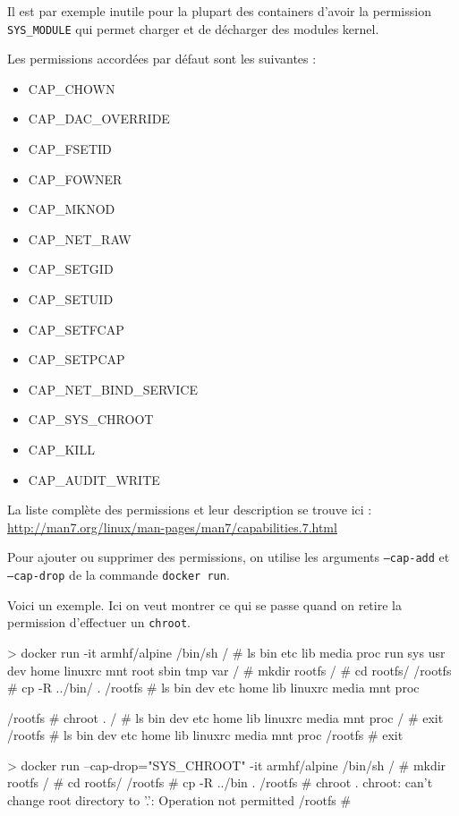 \documentclass[11pt,a4paper,oneside]{report}
\newcommand{\code}[1]{\texttt{#1}}
\begin{document}
Il est par exemple inutile pour la plupart des containers d'avoir la permission \code{SYS\_MODULE} qui permet charger et de décharger des modules kernel.

Les permissions accordées par défaut sont les suivantes\cite{github_docker_kernel_capabilities} :
\begin{itemize}
\item CAP\_CHOWN
\item CAP\_DAC\_OVERRIDE
\item CAP\_FSETID
\item CAP\_FOWNER
\item CAP\_MKNOD
\item CAP\_NET\_RAW
\item CAP\_SETGID
\item CAP\_SETUID
\item CAP\_SETFCAP
\item CAP\_SETPCAP
\item CAP\_NET\_BIND\_SERVICE
\item CAP\_SYS\_CHROOT
\item CAP\_KILL
\item CAP\_AUDIT\_WRITE
\end{itemize}

La liste complète des permissions et leur description se trouve ici : \url{http://man7.org/linux/man-pages/man7/capabilities.7.html}

Pour ajouter ou supprimer des permissions, on utilise les arguments \code{--cap-add} et \code{--cap-drop} de la commande \code{docker run}.

Voici un exemple. Ici on veut montrer ce qui se passe quand on retire la permission d'effectuer un \code{chroot}.
\begin{textcode}
> docker run -it armhf/alpine /bin/sh
/ # ls
bin   etc   lib       media   proc   run    sys   usr
dev   home  linuxrc   mnt     root   sbin   tmp   var
/ # mkdir rootfs
/ # cd rootfs/
/rootfs # cp -R ../bin/ .
/rootfs # ls
bin   dev   etc   home   lib   linuxrc  media   mnt   proc

/rootfs # chroot .
/ # ls
bin   dev   etc   home   lib   linuxrc  media   mnt   proc
/ # exit
/rootfs # ls
bin   dev   etc   home   lib   linuxrc  media   mnt   proc
/rootfs # exit


> docker run --cap-drop="SYS_CHROOT" -it armhf/alpine /bin/sh
/ # mkdir rootfs
/ # cd rootfs/
/rootfs # cp -R ../bin .
/rootfs # chroot .
chroot: can't change root directory to '.': Operation not permitted
/rootfs #
\end{textcode}
\end{document}
